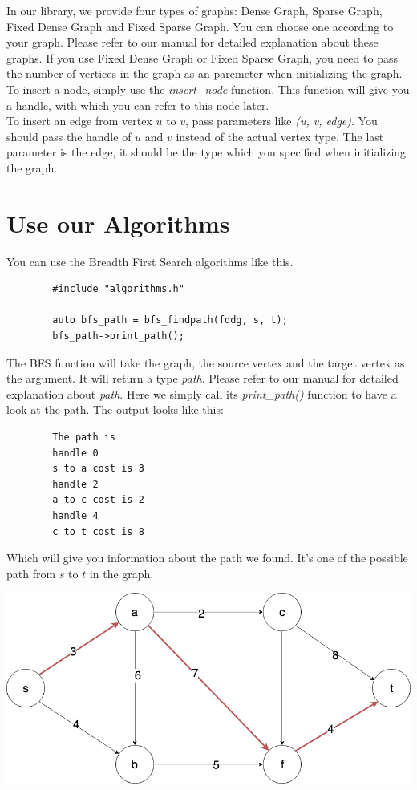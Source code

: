 \documentclass{article}
\begin{document}
In our library, we provide four types of graphs: Dense Graph, Sparse Graph, Fixed Dense Graph and Fixed Sparse Graph. You can choose one according to your graph. Please refer to our manual for detailed explanation about these graphs. If you use Fixed Dense Graph or Fixed Sparse Graph, you need to pass the number of vertices in the graph as an paremeter when initializing the graph.
\\
To insert a node, simply use the \textit{insert\_node} function. This function will give you a handle, with which you can refer to this node later.
\\
To insert an edge from vertex $u$ to $v$, pass parameters like \textit{(u, v, edge)}. You should pass the handle of $u$ and $v$ instead of the actual vertex type. The last parameter is the edge, it should be the type which you specified when initializing the graph.

    \section {Use our Algorithms}
    You can use the Breadth First Search algorithms like this.
    \begin{lstlisting}
    	#include "algorithms.h"
    	
    	auto bfs_path = bfs_findpath(fddg, s, t);
        bfs_path->print_path();
    \end{lstlisting}
The BFS function will take the graph, the source vertex and the target vertex as the argument. It will return a type \textit{path}. Please refer to our manual for detailed explanation about \textit{path}. Here we simply call its \textit{print\_path()} function to have a look at the path. The output looks like this:

	\begin{lstlisting}
		The path is 
		handle 0
		s to a cost is 3
		handle 2
		a to c cost is 2
		handle 4
		c to t cost is 8
	\end{lstlisting}
Which will give you information about the path we found. It's one of the possible path from $s$ to $t$ in the graph.

	\begin{center}
		\includegraphics[width=\linewidth]  {graph2.png}
	\end{center}
\end{document}
